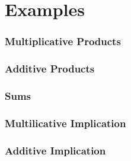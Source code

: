 \section{Examples}\label{sec:examples}

\begin{frame}
  \frametitle{Multiplicative Products}
  
\end{frame}

\begin{frame}
  \frametitle{Additive Products}
  
\end{frame}

\begin{frame}
  \frametitle{Sums}
  
\end{frame}

\begin{frame}
  \frametitle{Multilicative Implication}
  
\end{frame}

\begin{frame}
  \frametitle{Additive Implication}
  
\end{frame}


